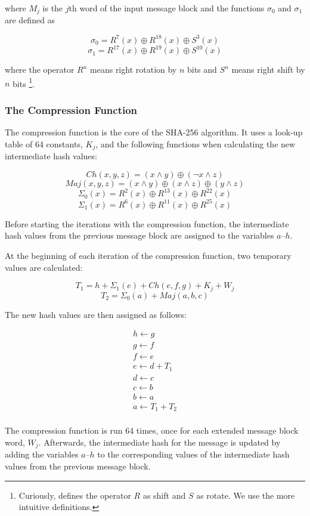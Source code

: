 \noindent where $M_j$ is the $j$th word of the input message block and the functions
$\sigma_0$ and $\sigma_1$ are defined as

\[\sigma_0 = R^7(x) \oplus R^{18}(x) \oplus S^3(x)\]
\[\sigma_1 = R^{17}(x) \oplus R^{19}(x) \oplus S^{10}(x)\]

\noindent where the operator $R^n$ means right rotation by $n$ bits and $S^n$ means right shift by $n$
bits \footnote{Curiously, \cite{sha-spec} defines the operator $R$ as shift and $S$ as rotate.
We use the more intuitive definitions.}.

\subsubsection{The Compression Function}
\label{sec:sha-compr}
The compression function is the core of the SHA-256 algorithm. It uses a look-up table
of 64 constants, $K_j$, and the following functions when calculating the new intermediate
hash values:

\[Ch(x,y,z) = (x \wedge y) \oplus (\neg x \wedge z)\]
\[Maj(x, y, z) = (x \wedge y) \oplus (x \wedge z) \oplus (y \wedge z)\]
\[\Sigma_0(x) = R^2(x) \oplus R^{13}(x) \oplus R^{22}(x)\]
\[\Sigma_1(x) = R^6(x) \oplus R^{11}(x) \oplus R^{25}(x)\]

Before starting the iterations with the compression function, the intermediate
hash values from the previous message block are assigned to the variables $a$--$h$.

At the beginning of each iteration of the compression function, two temporary
values are calculated:

\[T_1 = h + \Sigma_1(e) + Ch(e, f, g) + K_j + W_j\]
\[T_2 = \Sigma_0(a) + Maj(a, b, c)\]

The new hash values are then assigned as follows:

\[\begin{array}{l}
	h \leftarrow g \\
	g \leftarrow f \\
	f \leftarrow e \\
	e \leftarrow d + T_1\\
	d \leftarrow c \\
	c \leftarrow b \\
	b \leftarrow a \\
	a \leftarrow T_1 + T_2 \\
\end{array}\]

The compression function is run 64 times, once for each extended message block word,
$W_j$. Afterwards, the intermediate hash for the message is updated by adding the
variables $a$--$h$ to the corresponding values of the intermediate hash values from
the previous message block.


